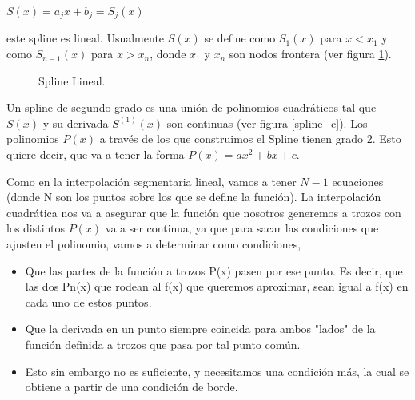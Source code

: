 \begin{center}

$\displaystyle{S(x) = a_{j}x + b_{j} = S_{j}(x)}$

\end{center}

\vspace{0.5cm}

\noindent este spline es lineal. Usualmente $S(x)$ se define como $S_{1}(x)$ para $x<x_{1}$ y como $S_{n-1}(x)$ para $x>x_{n}$, donde $x_{1}$ y $x_{n}$ son nodos frontera (ver figura \ref{spline_l}).


\begin{figure}[h]
\caption{Spline Lineal.}
\label{spline_l}
\end{figure}


\hspace{0.4cm} Un spline de segundo grado es una uni\'on de polinomios cuadr\'aticos tal que $S(x)$ y su derivada $S^{(1)}(x)$ son continuas (ver figura \ref{spline_c}). Los polinomios $P(x)$ a trav\'es de los que construimos el Spline tienen grado 2. Esto quiere decir, que va a tener la forma $P(x) = ax^2 + bx + c$.

\hspace{0.4cm} Como en la interpolaci\'on segmentaria lineal, vamos a tener $N-1$ ecuaciones (donde N son los puntos sobre los que se define la funci\'on). La interpolaci\'on cuadr\'atica nos va a asegurar que la funci\'on que nosotros generemos a trozos con los distintos $P(x)$ va a ser continua, ya que para sacar las condiciones que ajusten el polinomio, vamos a determinar como condiciones,

\begin{itemize}
  \item Que las partes de la funci\'on a trozos P(x) pasen por ese punto. Es decir, que las dos Pn(x) que rodean al f(x) que queremos aproximar, sean igual a f(x) en cada uno de estos puntos.
  \item Que la derivada en un punto siempre coincida para ambos "lados" de la funci\'on definida a trozos que pasa por tal punto com\'un.
  \item Esto sin embargo no es suficiente, y necesitamos una condici\'on m\'as, la cual se obtiene a partir de una condici\'on de borde.
\end{itemize}



